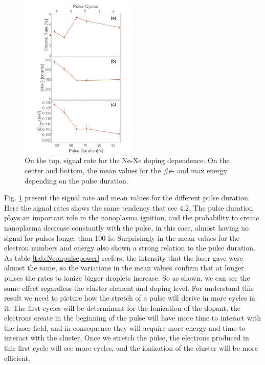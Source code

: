 \begin{figure}[hbtp]
\centering
\includegraphics[width=0.5\textwidth]{../Images/results/MIR_Ne_pulseduration/Alltogether.png}
\caption[MIR Ne pulse duration. Signal rate and mean values]{On the top, signal rate for the Ne-Xe doping dependence. On the center and bottom, the mean values for the $\#$e- and max energy depending on the pulse duration.}
\label{fig:Nepulseall}
\end{figure}

Fig. \ref{fig:Nepulseall} present the signal rate and mean values for the different pulse duration. Here the signal rates shows the same tendency that sec 4.2, The pulse duration plays an important role in the nanoplasma ignition, and the probability to create nanoplasma decrease constantly with the pulse, in this case, almost having no signal for pulses longer than 100 fs. Surprisingly in the mean values for the electron numbers and energy also shown a strong relation to the pulse duration. As table \ref{tab:Neonpulsepower} reefers, the intensity that the laser gave were almost the same, so the variations in the mean values confirm that at longer pulses the rates to ionize bigger droplets increase. So as shown, we can see the same effect regardless the cluster element and doping level. For understand this result we need to picture how the stretch of a pulse will derive in more cycles in it. The first cycles will be determinant for the Ionization of the dopant, the electrons create in the beginning of the pulse will have more time to interact with the laser field, and in consequence they will acquire more energy and time to interact with the cluster. Once we stretch the pulse, the electrons produced in this first cycle will see more cycles, and the ionization of the cluster will be more efficient. 








